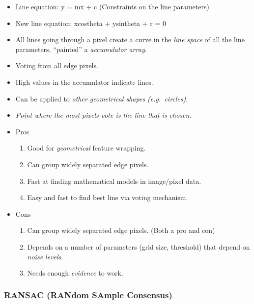 \documentclass[english, 10pt]{article}
\begin{document}
\begin{itemize}
\itemsep1pt\parskip0pt
\item
  Line equation: y = mx + c (Constraints on the line parameters)
\item
  New line equation: xcostheta + ysintheta + r = 0
\item
  All lines going through a pixel create a curve in the \emph{line
  space} of all the line parameters, ``painted'' a \emph{accumulator
  array}.
\item
  Voting from all edge pixels.
\item
  High values in the accumulator indicate lines.
\item
  Can be applied to \emph{other geometrical shapes (e.g.~circles)}.
\item
  \emph{Point where the most pixels vote is the line that is chosen.}
\item
  Pros

  \begin{enumerate}
  \def\labelenumi{\arabic{enumi}.}
  \itemsep1pt\parskip0pt
  \item
    Good for \emph{geometrical} feature wrapping.
  \item
    Can group widely separated edge pixels.
  \item
    Fast at finding mathematical models in image/pixel data.
  \item
    Easy and fast to find best line via voting mechanism.
  \end{enumerate}
\item
  Cons

  \begin{enumerate}
  \def\labelenumi{\arabic{enumi}.}
  \itemsep1pt\parskip0pt
  \item
    Can group widely separated edge pixels. (Both a pro and con)
  \item
    Depends on a number of parameters (grid size, threshold) that depend
    on \emph{noise levels}.
  \item
    Needs enough \emph{evidence} to work.
  \end{enumerate}
\end{itemize}

\subsubsection{RANSAC (RANdom SAmple
Consensus)}\label{ransac-random-sample-consensus}
\end{document}
